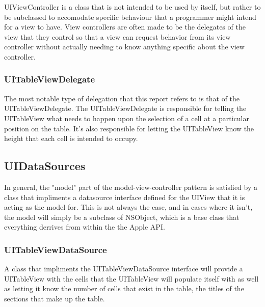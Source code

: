 \documentclass[se]{uw-wkrpt}
\begin{document}
UIViewController is a class that is not intended to be used by itself, 
but rather to be subclassed to accomodate specific behaviour that
a programmer might intend for a view to have. View controllers are
often made to be the delegates of the view that they control so that
a view can request behavior from its view controller without actually
needing to know anything specific about the view controller. 

\subsubsection{UITableViewDelegate}

The most notable type of delegation that this report refers to is
that of the UITableViewDelegate. The UITableViewDelegate is responsible
for telling the UITableView what needs to happen upon the selection of
a cell at a particular position on the table. It's also responsible for 
letting the UITableView know the height that each cell is intended to
occupy.

\subsection{UIDataSources}

In general, the "model" part of the model-view-controller pattern is 
satisfied by a class that impliments a datasource interface defined for
the UIView that it is acting as the model for. This is not always
the case, and in cases where it isn't, the model will simply be a 
subclass of NSObject, which is a base class that everything derrives from
within the the Apple API.

\subsubsection{UITableViewDataSource}

A class that impliments the UITableViewDataSource interface will provide
a UITableView with the cells that the UITableView will populate itself with
as well as letting it know the number of cells that exist in the table,
the titles of the sections that make up the table.
\end{document}

